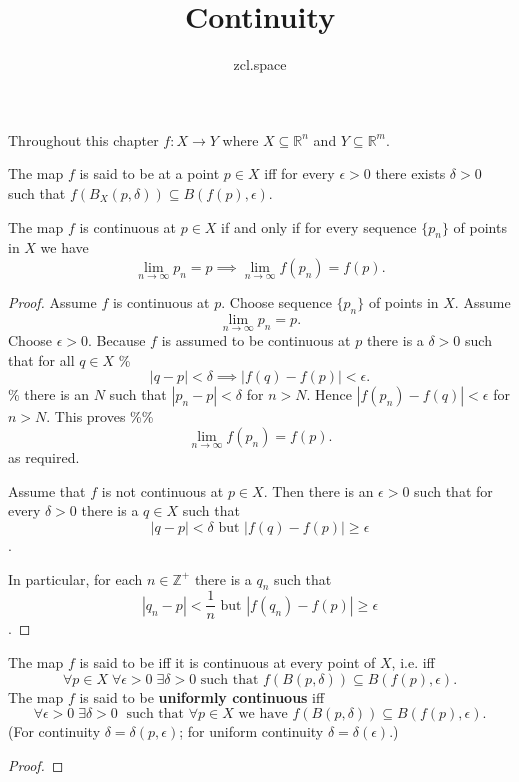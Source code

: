 \documentclass[10pt,a4paper,UTF8]{article}
\author{zcl.space}
\date{}
\title{Continuity}
\begin{document}
\maketitle
\tableofcontents
Throughout this chapter
\(f:X\to Y\) where \(X\subseteq\mathbb{R}^n\) and \(Y\subseteq\mathbb{R}^m\).
\begin{definition}
The map  \(f\) is said to be  at
a point  \(p\in X\)  iff
for every \(\epsilon > 0\) there exists \(\delta > 0\)
such that \(f(B_X(p,\delta))\subseteq B(f(p),\epsilon)\).
\end{definition}
\begin{tikztheorem}
The map \(f\) is continuous at \(p\in X\) if and only if
for every sequence \(\{p_n\}\) of points in \(X\) we have
\begin{equation}\label{eq:limpif}
    \lim_{n\to\infty}p_n=p\implies \lim_{n\to\infty}f(p_n)=f(p).
\end{equation}
\end{tikztheorem}

\begin{proof}
Assume \(f\) is continuous at \(p\).
Choose sequence \(\{p_n\}\) of points in \(X\).
Assume
\begin{equation}\label{eq:limp}
\lim_{n\to\infty}p_n=p.
\end{equation}
Choose \(\epsilon > 0\). Because \(f\) is assumed to be
continuous at \(p\) there is a \(\delta > 0\) such that
for all \(q\in X\)
\%
\begin{equation}\label{eq:imp}
|q-p| < \delta\implies |f(q)-f(p)| < \epsilon.
\end{equation}
\%
there is an \(N\) such that
\(|p_n-p| < \delta\) for \(n > N\). Hence
\(|f(p_n)-f(q)| < \epsilon\) for \(n > N\). This proves
\%\%
\begin{equation}\label{eq:limf}
\lim_{n\to\infty} f(p_n)=f(p).
\end{equation}
as required.

 Assume that \(f\) is not continuous at \(p\in X\).
Then there is an \(\epsilon > 0\) such that for every \(\delta > 0\) there
is a \(q\in X\) such that \[  |q-p| < \delta\mbox{ but }  |f(q)-f(p)|\ge\epsilon\] .

In particular, for each \(n\in\mathbb{Z}^+\) there is a \(q_n\) such that \[  |q_n-p| < \frac1n \mbox{ but }  |f(q_n)-f(p)|\ge\epsilon \].
\end{proof}
\begin{definition}
The map  \(f\) is said to be 
iff it is continuous at every  point  of \(X\), i.e. iff
$$
\forall p\in X\;\forall \epsilon > 0\;\exists\delta > 0 \mbox{ such that }
f(B(p,\delta))\subseteq B(f(p),\epsilon).
$$
The map  \(f\) is said to be \textbf{uniformly continuous}
iff
$$
\forall \epsilon > 0\;\exists\delta > 0\; \mbox{ such that } \forall p\in X
\mbox{ we have } f(B(p,\delta))\subseteq B(f(p),\epsilon).
$$
(For continuity \(\delta=\delta(p,\epsilon)\);
 for uniform continuity \(\delta=\delta(\epsilon)\).)
\end{definition}
\begin{proof}
\end{proof}
\end{document}
